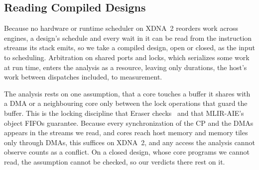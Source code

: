 \subsection{Reading Compiled Designs}
\label{sec:order}

Because no hardware or runtime scheduler on XDNA~2 reorders work across engines, a design's schedule and every wait in it can be read from the instruction streams its stack emits, so we take a compiled design, open or closed, as the input to scheduling.
Arbitration on shared ports and locks, which serializes some work at run time, enters the analysis as a resource, leaving only durations, the host's work between dispatches included, to measurement.

The analysis rests on one assumption, that a core touches a buffer it shares with a DMA or a neighbouring core only between the lock operations that guard the buffer.
This is the locking discipline that Eraser checks~\citep{savage1997eraser} and that MLIR-AIE's object FIFOs guarantee.
Because every synchronization of the CP and the DMAs appears in the streams we read, and cores reach host memory and memory tiles only through DMAs, this suffices on XDNA~2, and any access the analysis cannot observe counts as a conflict.
On a closed design, whose core programs we cannot read, the assumption cannot be checked, so our verdicts there rest on it.

